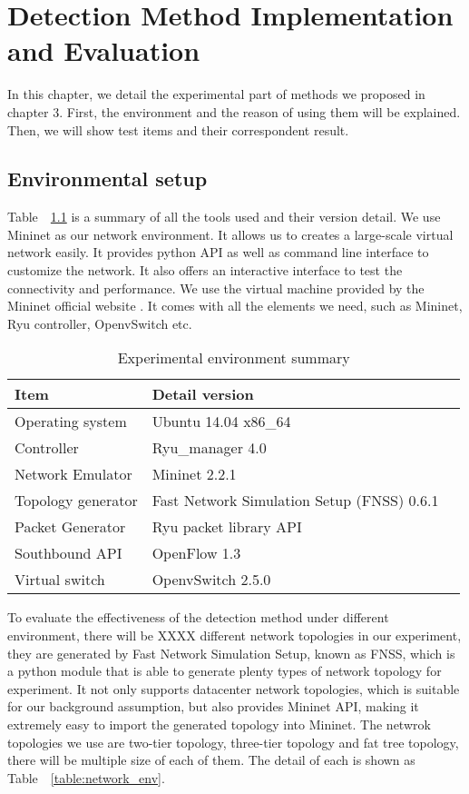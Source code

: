 \chapter{Detection Method Implementation and Evaluation}
In this chapter, we detail the experimental part of methods we proposed in chapter 3. First, the environment and the reason of using them will be explained. Then, we will show test items and their correspondent result.

\section{Environmental setup}
Table~~\ref{table:Experiment_table} is a summary of all the tools used and their version detail. We use Mininet as our network environment. It allows us to creates a large-scale virtual network easily. 
It provides python API as well as command line interface to customize the network. It also offers an interactive interface to test the connectivity and performance. We use the virtual machine provided by the Mininet official website \cite{Mininet}. It comes with all the elements we need, such as Mininet, Ryu controller, OpenvSwitch etc.

\begin{table}[H]
\centering
\caption{Experimental environment summary}
\begin{tabular}{|l|p{4cm}|p{4.5cm}}
\hline Item & Detail version \\
\hline Operating system & Ubuntu 14.04 x86\_64 \\
\hline Controller & Ryu\_manager 4.0 \\
\hline Network Emulator & Mininet 2.2.1 \\
\hline Topology generator & Fast Network Simulation Setup (FNSS) 0.6.1\\
\hline Packet Generator & Ryu packet library API \\
\hline Southbound API & OpenFlow 1.3 \\
\hline Virtual switch & OpenvSwitch 2.5.0 \\
\hline 
\end{tabular}
\label{table:Experiment_table}
\end{table}

To evaluate the effectiveness of the detection method under different environment, there will be XXXX different network topologies in our experiment, they are generated by Fast Network Simulation Setup, known as FNSS, which is a python module that is able to generate plenty types of network topology for experiment. It not only supports datacenter network topologies, which is suitable for our background assumption, but also provides Mininet API, making it extremely easy to import the generated topology into Mininet. The netwrok topologies we use are two-tier topology, three-tier topology and fat tree topology, there will be multiple size of each of them. The detail of each is shown as Table~~\ref{table:network_env}.

